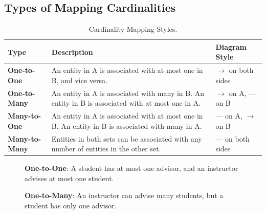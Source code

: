 \documentclass[12pt,a4paper]{article}
\begin{document}
\subsection{Types of Mapping Cardinalities}
\begin{table}[H]
\centering
\begin{tabular}{@{}lp{8cm}l@{}}
\toprule
\textbf{Type} & \textbf{Description} & \textbf{Diagram Style} \\ \midrule
\textbf{One-to-One} & An entity in A is associated with at most one in B, and vice versa. & $\rightarrow$ on both sides \\
\textbf{One-to-Many} & An entity in A is associated with many in B. An entity in B is associated with at most one in A. & $\rightarrow$ on A, — on B \\
\textbf{Many-to-One} & An entity in A is associated with at most one in B. An entity in B is associated with many in A. & — on A, $\rightarrow$ on B \\
\textbf{Many-to-Many} & Entities in both sets can be associated with any number of entities in the other set. & — on both sides \\ \bottomrule
\end{tabular}
\caption{Cardinality Mapping Styles.}
\end{table}

\begin{figure}[H]
    \centering
    \caption{\textbf{One-to-One}: A student has at most one advisor, and an instructor advises at most one student.}
\end{figure}

\begin{figure}[H]
    \centering
    \caption{\textbf{One-to-Many}: An instructor can advise many students, but a student has only one advisor.}
\end{figure}
\end{document}
